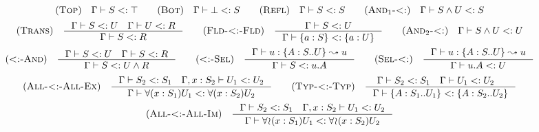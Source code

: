 \begin{minipage}{\textwidth} \[\begin{array}{c}
    \RULE{Top} \quad \SJ{\Gamma}{S}{\top} \qquad

    \RULE{Bot} \quad \SJ{\Gamma}{\bot}{S} \qquad

    \RULE{Refl} \quad \SJ{\Gamma}{S}{S} \qquad

    \RULE{And$_1$-<:} \quad \SJ{\Gamma}{\AGG{S}{U}}{S} \\[2mm]

    \RULE{Trans} \quad \inference{
        \SJ{\Gamma}{S}{U} \quad
        \SJ{\Gamma}{U}{R}
    }{
        \SJ{\Gamma}{S}{R}
    } \qquad

    \RULE{Fld-<:-Fld} \quad \inference{
        \SJ{\Gamma}{S}{U}
    }{
        \SJ{\Gamma}{\FDEC{a}{S}}{\FDEC{a}{U}}
    } \qquad

    \RULE{And$_2$-<:} \quad \SJ{\Gamma}{\AGG{S}{U}}{U} \\[4mm]

    \RULE{<:-And} \quad \inference{
        \SJ{\Gamma}{S}{U} \quad
        \SJ{\Gamma}{S}{R}
    }{
        \SJ{\Gamma}{S}{\AGG{U}{R}}
    } \qquad

    \RULE{<:-Sel} \quad \inference{
        \TJ{\Gamma}{u}{\TDEC{A}{S}{U}}{u}
    }{
        \SJ{\Gamma}{S}{u.A}
    } \qquad

    \RULE{Sel-<:} \quad \inference{
        \TJ{\Gamma}{u}{\TDEC{A}{S}{U}}{u}
    }{
        \SJ{\Gamma}{u.A}{U}
    } \\[4mm]

    \RULE{All-<:-All-Ex} \quad \inference{
        \SJ{\Gamma}{S_2}{S_1} \quad
        \SJ{\Gamma, x: S_2}{U_1}{U_2}
    }{
        \SJ{\Gamma}{\DFUN{x}{S_1}{U_1}}{\DFUN{x}{S_2}{U_2}}
    } \qquad

    \RULE{Typ-<:-Typ} \quad \inference{
        \SJ{\Gamma}{S_2}{S_1} \quad
        \SJ{\Gamma}{U_1}{U_2} \quad
    }{
        \SJ{\Gamma}{\TDEC{A}{S_1}{U_1}}{\TDEC{A}{S_2}{U_2}}
    } \\[4mm]

    \RULE{All-<:-All-Im} \quad \inference{
        \SJ{\Gamma}{S_2}{S_1} \quad
        \SJ{\Gamma, x: S_2}{U_1}{U_2}
    }{
        \SJ{\Gamma}{\IFUN{x}{S_1}{U_1}}{\IFUN{x}{S_2}{U_2}}
    }
\end{array}\] \end{minipage}
